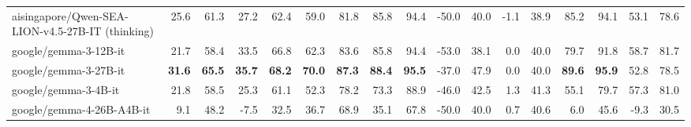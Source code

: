 \documentclass{article}
\begin{document}
\begin{table}[htbp]
\begin{threeparttable}
\begin{adjustbox}{max width=\textwidth}
\begin{tabular}{lrrrrrrrrrrrrrrrr}
aisingapore/Qwen-SEA-LION-v4.5-27B-IT (thinking) & \cellcolor[HTML]{BBDBEA}25.6 & \cellcolor[HTML]{B6D8E8}61.3 & \cellcolor[HTML]{BCDBEA}27.2 & \cellcolor[HTML]{B5D7E8}62.4 & \cellcolor[HTML]{BEDCEB}59.0 & \cellcolor[HTML]{B5D8E8}81.8 & \cellcolor[HTML]{9AC9E0}85.8 & \cellcolor[HTML]{98C8E0}94.4 & \cellcolor[HTML]{F8CBB7}-50.0 & \cellcolor[HTML]{F9CEBC}40.0 & \cellcolor[HTML]{E3F0F6}-1.1 & \cellcolor[HTML]{E1EFF6}38.9 & \cellcolor[HTML]{9CCAE1}85.2 & \cellcolor[HTML]{98C8E0}94.1 & \cellcolor[HTML]{D0E6F0}53.1 & \cellcolor[HTML]{BDDCEB}78.6 \\
google/gemma-3-12B-it & \cellcolor[HTML]{D7E9F2}21.7 & \cellcolor[HTML]{CFE5F0}58.4 & \cellcolor[HTML]{9CCAE1}33.5 & \cellcolor[HTML]{9AC9E0}66.8 & \cellcolor[HTML]{B0D5E7}62.3 & \cellcolor[HTML]{AAD2E5}83.6 & \cellcolor[HTML]{9AC9E0}85.8 & \cellcolor[HTML]{98C8E0}94.4 & \cellcolor[HTML]{F6B89C}-53.0 & \cellcolor[HTML]{F6BA9F}38.1 & \cellcolor[HTML]{C1DEEC}0.0 & \cellcolor[HTML]{C0DDEB}40.0 & \cellcolor[HTML]{A8D1E4}79.7 & \cellcolor[HTML]{A1CDE2}91.8 & \cellcolor[HTML]{C3DFEC}58.7 & \cellcolor[HTML]{B3D6E8}81.7 \\
google/gemma-3-27B-it & \cellcolor[HTML]{92C5DE}\textbf{31.6} & \cellcolor[HTML]{92C5DE}\textbf{65.5} & \cellcolor[HTML]{92C5DE}\textbf{35.7} & \cellcolor[HTML]{92C5DE}\textbf{68.2} & \cellcolor[HTML]{92C5DE}\textbf{70.0} & \cellcolor[HTML]{92C5DE}\textbf{87.3} & \cellcolor[HTML]{92C5DE}\textbf{88.4} & \cellcolor[HTML]{92C5DE}\textbf{95.5} & \cellcolor[HTML]{D8EAF3}-37.0 & \cellcolor[HTML]{D3E7F1}47.9 & \cellcolor[HTML]{C1DEEC}0.0 & \cellcolor[HTML]{C0DDEB}40.0 & \cellcolor[HTML]{92C5DE}\textbf{89.6} & \cellcolor[HTML]{92C5DE}\textbf{95.9} & \cellcolor[HTML]{D1E6F1}52.8 & \cellcolor[HTML]{BEDCEB}78.5 \\
google/gemma-3-4B-it & \cellcolor[HTML]{D6E9F2}21.8 & \cellcolor[HTML]{CEE5F0}58.5 & \cellcolor[HTML]{C5E0ED}25.3 & \cellcolor[HTML]{BDDBEB}61.1 & \cellcolor[HTML]{D9EAF3}52.3 & \cellcolor[HTML]{CDE4F0}78.2 & \cellcolor[HTML]{C4DFED}73.3 & \cellcolor[HTML]{B9DAE9}88.9 & \cellcolor[HTML]{FBE5DB}-46.0 & \cellcolor[HTML]{FCE9E1}42.5 & \cellcolor[HTML]{98C8E0}1.3 & \cellcolor[HTML]{98C8DF}41.3 & \cellcolor[HTML]{E2EFF6}55.1 & \cellcolor[HTML]{CDE4EF}79.7 & \cellcolor[HTML]{C6E0ED}57.3 & \cellcolor[HTML]{B6D8E8}81.0 \\
google/gemma-4-26B-A4B-it & \cellcolor[HTML]{FAD7C8}9.1 & \cellcolor[HTML]{FADED1}48.2 & \cellcolor[HTML]{F4A582}-7.5 & \cellcolor[HTML]{F4A583}32.5 & \cellcolor[HTML]{FCE9E1}36.7 & \cellcolor[HTML]{FDF5F1}68.9 & \cellcolor[HTML]{F8C7B1}35.1 & \cellcolor[HTML]{F9D0BD}67.8 & \cellcolor[HTML]{F8CBB7}-50.0 & \cellcolor[HTML]{F9CEBC}40.0 & \cellcolor[HTML]{ADD3E6}0.7 & \cellcolor[HTML]{ACD2E5}40.6 & \cellcolor[HTML]{F6B89C}6.0 & \cellcolor[HTML]{F7C1A9}45.6 & \cellcolor[HTML]{F4AB8B}-9.3 & \cellcolor[HTML]{F5AF90}30.5 \\

\end{tabular}
\end{adjustbox}
\end{threeparttable}
\end{table}
\end{document}
